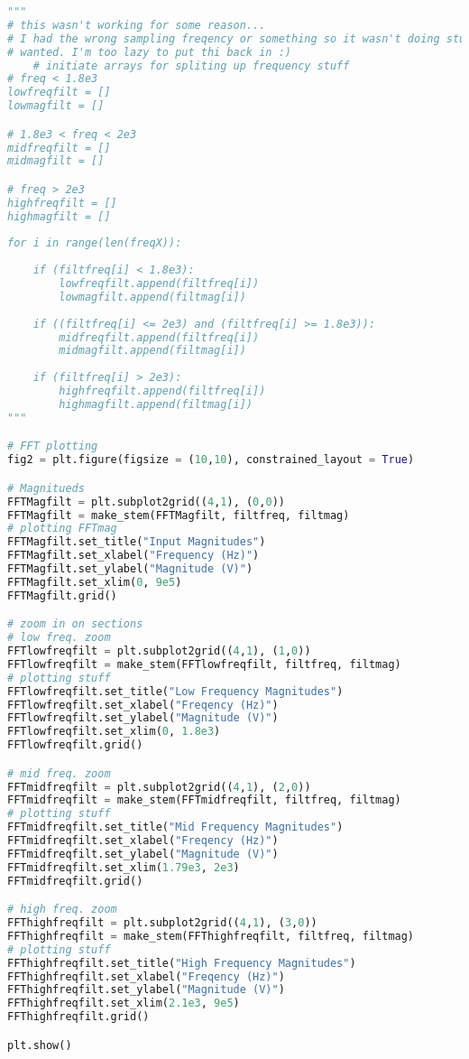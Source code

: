 \documentclass[12pt,a4paper]{article}
\begin{document}
\begin{lstlisting}[language=Python]
"""
# this wasn't working for some reason...
# I had the wrong sampling freqency or something so it wasn't doing stuff I
# wanted. I'm too lazy to put thi back in :)
    # initiate arrays for spliting up frequency stuff
# freq < 1.8e3
lowfreqfilt = []
lowmagfilt = []

# 1.8e3 < freq < 2e3
midfreqfilt = []
midmagfilt = []

# freq > 2e3 
highfreqfilt = []
highmagfilt = []
    
for i in range(len(freqX)):
    
    if (filtfreq[i] < 1.8e3):
        lowfreqfilt.append(filtfreq[i])
        lowmagfilt.append(filtmag[i])
    
    if ((filtfreq[i] <= 2e3) and (filtfreq[i] >= 1.8e3)):
        midfreqfilt.append(filtfreq[i])
        midmagfilt.append(filtmag[i])
        
    if (filtfreq[i] > 2e3):
        highfreqfilt.append(filtfreq[i])
        highmagfilt.append(filtmag[i])
"""

# FFT plotting
fig2 = plt.figure(figsize = (10,10), constrained_layout = True)

# Magnitueds
FFTMagfilt = plt.subplot2grid((4,1), (0,0))
FFTMagfilt = make_stem(FFTMagfilt, filtfreq, filtmag)
# plotting FFTmag
FFTMagfilt.set_title("Input Magnitudes")
FFTMagfilt.set_xlabel("Frequency (Hz)")
FFTMagfilt.set_ylabel("Magnitude (V)")
FFTMagfilt.set_xlim(0, 9e5)
FFTMagfilt.grid()

# zoom in on sections
# low freq. zoom
FFTlowfreqfilt = plt.subplot2grid((4,1), (1,0))
FFTlowfreqfilt = make_stem(FFTlowfreqfilt, filtfreq, filtmag)
# plotting stuff
FFTlowfreqfilt.set_title("Low Frequency Magnitudes")
FFTlowfreqfilt.set_xlabel("Freqency (Hz)")
FFTlowfreqfilt.set_ylabel("Magnitude (V)")
FFTlowfreqfilt.set_xlim(0, 1.8e3)
FFTlowfreqfilt.grid()

# mid freq. zoom
FFTmidfreqfilt = plt.subplot2grid((4,1), (2,0))
FFTmidfreqfilt = make_stem(FFTmidfreqfilt, filtfreq, filtmag)
# plotting stuff
FFTmidfreqfilt.set_title("Mid Frequency Magnitudes")
FFTmidfreqfilt.set_xlabel("Freqency (Hz)")
FFTmidfreqfilt.set_ylabel("Magnitude (V)")
FFTmidfreqfilt.set_xlim(1.79e3, 2e3)
FFTmidfreqfilt.grid()

# high freq. zoom
FFThighfreqfilt = plt.subplot2grid((4,1), (3,0))
FFThighfreqfilt = make_stem(FFThighfreqfilt, filtfreq, filtmag)
# plotting stuff
FFThighfreqfilt.set_title("High Frequency Magnitudes")
FFThighfreqfilt.set_xlabel("Freqency (Hz)")
FFThighfreqfilt.set_ylabel("Magnitude (V)")
FFThighfreqfilt.set_xlim(2.1e3, 9e5)
FFThighfreqfilt.grid()

plt.show()
\end{lstlisting}
\end{document}

